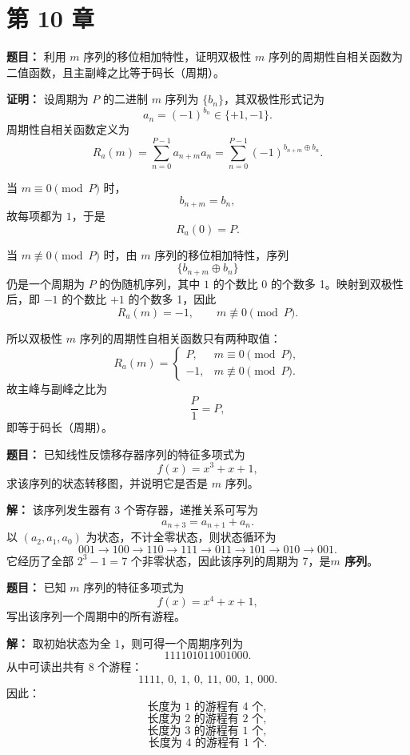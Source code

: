 \section*{第 10 章}

\textbf{题目：}
利用 $m$ 序列的移位相加特性，证明双极性 $m$ 序列的周期性自相关函数为二值函数，且主副峰之比等于码长（周期）。

\par\textbf{证明：}
设周期为 $P$ 的二进制 $m$ 序列为 $\{b_n\}$，其双极性形式记为
\[
a_n=(-1)^{b_n}\in\{+1,-1\}.
\]
周期性自相关函数定义为
\[
R_a(m)=\sum_{n=0}^{P-1}a_{n+m}a_n
=\sum_{n=0}^{P-1}(-1)^{b_{n+m}\oplus b_n}.
\]

当 $m\equiv 0\pmod P$ 时，
\[
b_{n+m}=b_n,
\]
故每项都为 $1$，于是
\[
R_a(0)=P.
\]

当 $m\not\equiv 0\pmod P$ 时，由 $m$ 序列的移位相加特性，序列
\[
\{b_{n+m}\oplus b_n\}
\]
仍是一个周期为 $P$ 的伪随机序列，其中 $1$ 的个数比 $0$ 的个数多 1。映射到双极性后，即 $-1$ 的个数比 $+1$ 的个数多 1，因此
\[
R_a(m)=-1,\qquad m\not\equiv 0\pmod P.
\]

所以双极性 $m$ 序列的周期性自相关函数只有两种取值：
\[
R_a(m)=
\begin{cases}
P, & m\equiv 0\pmod P,\\
-1, & m\not\equiv 0\pmod P.
\end{cases}
\]
故主峰与副峰之比为
\[
\frac{P}{1}=P,
\]
即等于码长（周期）。

\medskip
{}
\textbf{题目：}
已知线性反馈移存器序列的特征多项式为
\[
f(x)=x^3+x+1,
\]
求该序列的状态转移图，并说明它是否是 $m$ 序列。

\par\textbf{解：}
该序列发生器有 $3$ 个寄存器，递推关系可写为
\[
a_{n+3}=a_{n+1}+a_n.
\]
以 $(a_2,a_1,a_0)$ 为状态，不计全零状态，则状态循环为
\[
001\to 100\to 110\to 111\to 011\to 101\to 010\to 001.
\]
它经历了全部 $2^3-1=7$ 个非零状态，因此该序列的周期为 7，是\textbf{$m$ 序列}。

\medskip
{}
\textbf{题目：}
已知 $m$ 序列的特征多项式为
\[
f(x)=x^4+x+1,
\]
写出该序列一个周期中的所有游程。

\par\textbf{解：}
取初始状态为全 1，则可得一个周期序列为
\[
111101011001000.
\]
从中可读出共有 8 个游程：
\[
1111,\ 0,\ 1,\ 0,\ 11,\ 00,\ 1,\ 000.
\]
因此：
\[
\text{长度为 1 的游程有 }4\text{ 个},
\]
\[
\text{长度为 2 的游程有 }2\text{ 个},
\]
\[
\text{长度为 3 的游程有 }1\text{ 个},
\]
\[
\text{长度为 4 的游程有 }1\text{ 个}.
\]

